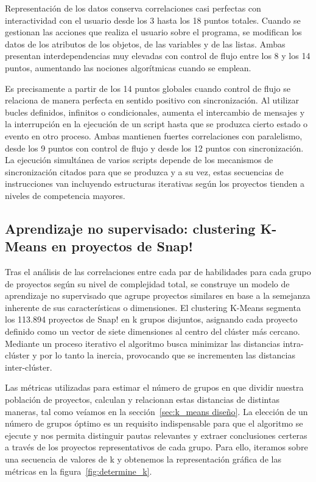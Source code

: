 \documentclass[a4paper, 12pt]{book}
\begin{document}
Representación de los datos conserva correlaciones casi perfectas con interactividad con el usuario desde los 3 hasta los 18 puntos totales. Cuando se gestionan las acciones que realiza el usuario sobre el programa, se modifican los datos de los atributos de los objetos, de las variables y de las listas. Ambas presentan interdependencias muy elevadas con control de flujo entre los 8 y los 14 puntos, aumentando las nociones algorítmicas cuando se emplean.

Es precisamente a partir de los 14 puntos globales cuando control de flujo se relaciona de manera perfecta en sentido positivo con sincronización. Al utilizar bucles definidos, infinitos o condicionales, aumenta el intercambio de mensajes y la interrupción en la ejecución de un script hasta que se produzca cierto estado o evento en otro proceso. Ambas mantienen fuertes correlaciones con paralelismo, desde los 9 puntos con control de flujo y desde los 12 puntos con sincronización. La ejecución simultánea de varios scripts depende de los mecanismos de sincronización citados para que se produzca y a su vez, estas secuencias de instrucciones van incluyendo estructuras iterativas según los proyectos tienden a niveles de competencia mayores.



\subsection{Aprendizaje no supervisado: clustering K-Means en proyectos de Snap!}
\label{subsec:kmeans_Snap}

Tras el análisis de las correlaciones entre cada par de habilidades para cada grupo de proyectos según su nivel de complejidad total, se construye un modelo de aprendizaje no supervisado que agrupe proyectos similares en base a la semejanza inherente de sus características o dimensiones. El clustering K-Means segmenta los 113.894 proyectos de Snap! en k grupos disjuntos, asignando cada proyecto definido como un vector de siete dimensiones al centro del clúster más cercano. Mediante un proceso iterativo el algoritmo busca minimizar las distancias intra-clúster y por lo tanto la inercia, provocando que se incrementen las distancias inter-clúster. 

Las métricas utilizadas para estimar el número de grupos en que dividir nuestra población de proyectos, calculan y relacionan estas distancias de distintas maneras, tal como veíamos en la sección~\ref{sec:k_means diseño}. La elección de un número de grupos óptimo es un requisito indispensable para que el algoritmo se ejecute y nos permita distinguir pautas relevantes y extraer conclusiones certeras a través de los proyectos representativos de cada grupo. Para ello, iteramos sobre una secuencia de valores de k y obtenemos la representación gráfica de las métricas en la figura~\ref{fig:determine_k}.
\end{document}
